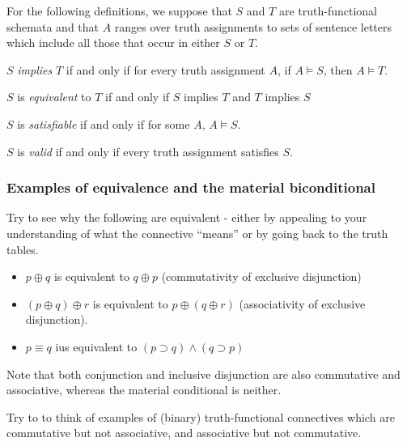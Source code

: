 For the following definitions, we suppose that $S$ and $T$ are truth-functional schemata and that $A$ ranges over truth assignments to sets of sentence letters which include all those that occur in either $S$ or $T$.

\begin{definition}\label{tf-eq-sat-val-def}
$S$ \emph{implies} $T$ if and only if for every truth assignment $A$, if $A\models S$, then $A\models T$.
\end{definition}

\begin{definition}
$S$ is \emph{equivalent} to $T$ if and only if $S$ implies $T$ and $T$ implies $S$
\end{definition}

\begin{definition}
$S$ is \emph{satisfiable} if and only if for some $A$, $A\models S$.
\end{definition}

\begin{definition}
$S$ is \emph{valid} if and only if every truth assignment satisfies $S$. 
\end{definition}
\subsubsection*{Examples of equivalence and the material biconditional}

Try to see why the following are equivalent - either by appealing to your understanding of what the connective ``means'' or by going back to the truth tables. 

\begin{itemize}
\item $p\oplus q$ is equivalent to $q\oplus p$ (commutativity of exclusive disjunction)  
\item $(p\oplus q)\oplus r$ is equivalent to $p\oplus(q\oplus r)$ (associativity of exclusive disjunction).
\item $p \equiv q$ ius equivalent to $(p \supset q) \land (q \supset p)$
\end{itemize}

Note that both conjunction and inclusive disjunction are also commutative and associative, whereas the material conditional is neither. 

\begin{aside}
    Try to to think of examples of (binary) truth-functional connectives which are commutative but not associative, and associative but not commutative.
\end{aside}